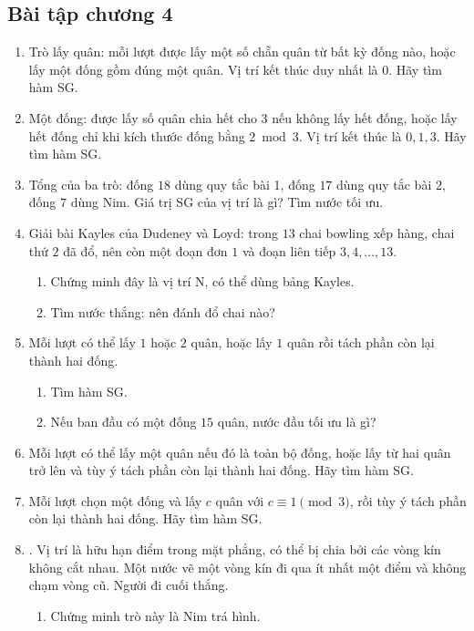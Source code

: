 \documentclass[11pt]{article}
\begin{document}
\subsection{Bài tập chương 4}

\begin{enumerate}
  \item Trò lấy quân: mỗi lượt được lấy một số chẵn quân từ bất kỳ đống nào,
  hoặc lấy một đống gồm đúng một quân. Vị trí kết thúc duy nhất là \(0\). Hãy
  tìm hàm SG.
  \item Một đống: được lấy số quân chia hết cho \(3\) nếu không lấy hết đống,
  hoặc lấy hết đống chỉ khi kích thước đống bằng \(2\bmod3\). Vị trí kết thúc
  là \(0,1,3\). Hãy tìm hàm SG.
  \item Tổng của ba trò: đống \(18\) dùng quy tắc bài 1, đống \(17\) dùng quy
  tắc bài 2, đống \(7\) dùng Nim. Giá trị SG của vị trí là gì? Tìm nước tối
  ưu.
  \item Giải bài Kayles của Dudeney và Loyd: trong \(13\) chai bowling xếp
  hàng, chai thứ \(2\) đã đổ, nên còn một đoạn đơn \(1\) và đoạn liên tiếp
  \(3,4,\ldots,13\).
  \begin{enumerate}
    \item Chứng minh đây là vị trí N, có thể dùng bảng Kayles.
    \item Tìm nước thắng: nên đánh đổ chai nào?
  \end{enumerate}
  \item Mỗi lượt có thể lấy \(1\) hoặc \(2\) quân, hoặc lấy \(1\) quân rồi tách
  phần còn lại thành hai đống.
  \begin{enumerate}
    \item Tìm hàm SG.
    \item Nếu ban đầu có một đống \(15\) quân, nước đầu tối ưu là gì?
  \end{enumerate}
  \item Mỗi lượt có thể lấy một quân nếu đó là toàn bộ đống, hoặc lấy từ hai
  quân trở lên và tùy ý tách phần còn lại thành hai đống. Hãy tìm hàm SG.
  \item Mỗi lượt chọn một đống và lấy \(c\) quân với \(c\equiv1\pmod3\), rồi
  tùy ý tách phần còn lại thành hai đống. Hãy tìm hàm SG.
  \item {}. Vị trí là hữu hạn điểm trong mặt phẳng, có thể bị chia bởi
  các vòng kín không cắt nhau. Một nước vẽ một vòng kín đi qua ít nhất một
  điểm và không chạm vòng cũ. Người đi cuối thắng.
  \begin{enumerate}
    \item Chứng minh trò này là Nim trá hình.

\end{enumerate}
\end{enumerate}
\end{document}

